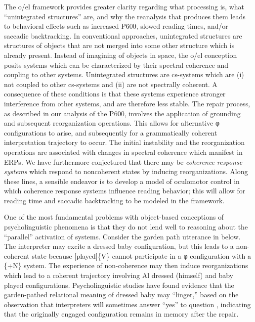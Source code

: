 The o/el framework provides greater clarity regarding what processing is, what “unintegrated structures” are, and why the reanalysis that produces them leads to behavioral effects such as increased P600, slowed reading times, and/or saccadic backtracking. In conventional approaches, unintegrated structures are structures of objects that are not merged into some other structure which is already present. Instead of imagining of objects in space, the o/el conception posits systems which can be characterized by their spectral coherence and coupling to other systems. Unintegrated structures are cs-systems which are (i) not coupled to other cs-systems and (ii) are not spectrally coherent. A consequence of these conditions is that these systems experience stronger interference from other systems, and are therefore less stable. The repair process, as described in our analysis of the P600, involves the application of grounding and subsequent reorganization operations. This allows for alternative φ configurations to arise, and subsequently for a grammatically coherent interpretation trajectory to occur. The initial instability and the reorganization operations are associated with changes in spectral coherence which manifest in ERPs. We have furthermore conjectured that there may be \textit{coherence response systems} which respond to noncoherent states by inducing reorganizations. Along these lines, a sensible endeavor is to develop a model of oculomotor control in which coherence response systems influence reading behavior; this will allow for reading time and saccadic backtracking to be modeled in the framework.

One of the most fundamental problems with object-based conceptions of psycholinguistic phenomena is that they do not lend well to reasoning about the “parallel” activation of systems. Consider the garden path utterance in  below. The interpreter may excite a {\textbar}dressed baby{\textbar} configuration, but this leads to a non-coherent state because [played]\{V\} cannot participate in a φ configuration with a \{+N\} system. The experience of non-coherence may then induce reorganizations which lead to a coherent trajectory involving {\textbar}Al dressed (himself){\textbar} and {\textbar}baby played{\textbar} configurations. Psycholinguistic studies have found evidence that the garden-pathed relational meaning of {\textbar}dressed baby{\textbar} may “linger,” based on the observation that interpreters will sometimes answer “yes” to question  \citep{SlatteryEtAl2013}, indicating that the originally engaged configuration remains in memory after the repair.

